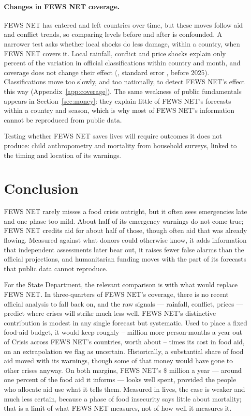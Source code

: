 \documentclass[11pt]{article}
\begin{document}
\paragraph{Changes in FEWS NET coverage.} FEWS NET has entered and left countries over time, but these moves follow aid and conflict trends, so comparing levels before and after is confounded. A narrower test asks whether local shocks do less damage, within a country, when FEWS NET covers it. Local rainfall, conflict and price shocks explain only \shockRsq{} percent of the variation in official classifications within country and month, and coverage does not change their effect (\covPre{}, standard error \covPreSe{}, before 2025). Classifications move too slowly, and too nationally, to detect FEWS NET's effect this way (Appendix~\ref{app:coverage}). The same weakness of public fundamentals appears in Section~\ref{sec:money}: they explain little of FEWS NET's forecasts within a country and season, which is why most of FEWS NET's information cannot be reproduced from public data.

Testing whether FEWS NET saves lives will require outcomes it does not produce: child anthropometry and mortality from household surveys, linked to the timing and location of its warnings.

\section{Conclusion}\label{sec:conclusion}

FEWS NET rarely misses a food crisis outright, but it often sees emergencies late and one phase too mild. About half of its emergency warnings do not come true; FEWS NET credits aid for about half of those, though often aid that was already flowing. Measured against what donors could otherwise know, it adds information that independent assessments later bear out, it raises fewer false alarms than the official projections, and humanitarian funding moves with the part of its forecasts that public data cannot reproduce.

For the State Department, the relevant comparison is with what would replace FEWS NET. In three-quarters of FEWS NET's coverage, there is no recent official analysis to fall back on, and the raw signals --- rainfall, conflict, prices --- predict where crises will strike much less well. FEWS NET's distinctive contribution is modest in any single forecast but systematic. Used to place a fixed food-aid budget, it would keep roughly \vmHalfGainAll{}--\vmRandGainAll{} million more person-months a year out of Crisis across FEWS NET's countries, worth about \vmHalfRatioAll{}--\vmRandRatioAll{} times its cost in food aid, on an extrapolation we flag as uncertain. Historically, a substantial share of food aid moved with its warnings, though some of that money would have gone to other crises anyway. On both margins, FEWS NET's \$\bcBudget{} million a year --- around one percent of the food aid it informs --- looks well spent, provided the people who allocate aid use what it tells them. Measured in lives, the case is weaker and much less certain, because a phase of food insecurity says little about mortality; that is a limit of what FEWS NET measures, not of how well it measures it.
\end{document}
